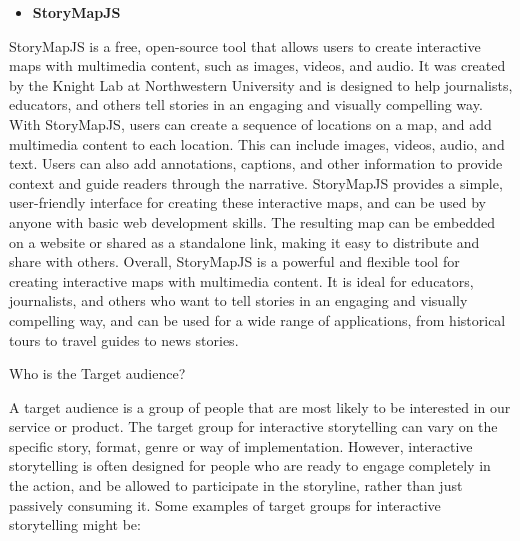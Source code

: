 \begin{itemize}
                \item \textbf{StoryMapJS}
 \end{itemize}

 StoryMapJS is a free, open-source tool that allows users to create interactive maps with multimedia content, such as images, videos, and audio. It was created by the Knight Lab at Northwestern University and is designed to help journalists, educators, and others tell stories in an engaging and visually compelling way.
With StoryMapJS, users can create a sequence of locations on a map, and add multimedia content to each location. This can include images, videos, audio, and text. Users can also add annotations, captions, and other information to provide context and guide readers through the narrative.
StoryMapJS provides a simple, user-friendly interface for creating these interactive maps, and can be used by anyone with basic web development skills. The resulting map can be embedded on a website or shared as a standalone link, making it easy to distribute and share with others.
Overall, StoryMapJS is a powerful and flexible tool for creating interactive maps with multimedia content. It is ideal for educators, journalists, and others who want to tell stories in an engaging and visually compelling way, and can be used for a wide range of applications, from historical tours to travel guides to news stories.

Who is the Target audience?

A target audience is a group of people that are most likely to be interested in our service or product. The target group for interactive storytelling can vary on the specific story, format, genre or way of implementation. However, interactive storytelling is often designed for people who are ready to engage completely in the action, and be allowed to participate in the storyline, rather than just passively consuming it.
Some examples of target groups for interactive storytelling might be:

